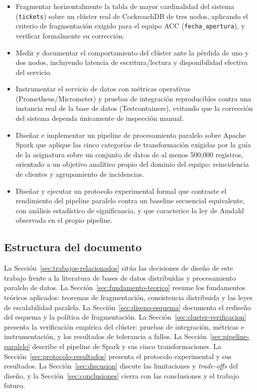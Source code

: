 \begin{itemize}[leftmargin=1.5em]
    \item Fragmentar horizontalmente la tabla de mayor cardinalidad del sistema
        (\texttt{tickets}) sobre un clúster real de CockroachDB de tres nodos, aplicando el
        criterio de fragmentación exigido para el equipo ACC (\texttt{fecha\_apertura}), y
        verificar formalmente su corrección.
    \item Medir y documentar el comportamiento del clúster ante la pérdida de uno y dos nodos,
        incluyendo latencia de escritura/lectura y disponibilidad efectiva del servicio.
    \item Instrumentar el servicio de datos con métricas operativas (Prometheus/Micrometer) y
        pruebas de integración reproducibles contra una instancia real de la base de datos
        (Testcontainers), evitando que la corrección del sistema dependa únicamente de
        inspección manual.
    \item Diseñar e implementar un pipeline de procesamiento paralelo sobre Apache Spark que
        aplique las cinco categorías de transformación exigidas por la guía de la asignatura
        sobre un conjunto de datos de al menos 500{,}000 registros, orientado a un objetivo
        analítico propio del dominio del equipo: reincidencia de clientes y agrupamiento de
        incidencias.
    \item Diseñar y ejecutar un protocolo experimental formal que contraste el rendimiento del
        pipeline paralelo contra un baseline secuencial equivalente, con análisis estadístico de
        significancia, y que caracterice la ley de Amdahl~\cite{amdahl1967validity} observada en
        el propio pipeline.
\end{itemize}

\subsection{Estructura del documento}

La Sección~\ref{sec:trabajos-relacionados} sitúa las decisiones de diseño de este trabajo frente a
la literatura de bases de datos distribuidas y procesamiento paralelo de datos. La
Sección~\ref{sec:fundamento-teorico} resume los fundamentos teóricos aplicados: teoremas de
fragmentación, consistencia distribuida y las leyes de escalabilidad paralela. La
Sección~\ref{sec:diseno-esquema} documenta el rediseño del esquema y la política de fragmentación.
La Sección~\ref{sec:cluster-verificacion} presenta la verificación empírica del clúster: pruebas
de integración, métricas e instrumentación, y los resultados de tolerancia a fallos. La
Sección~\ref{sec:pipeline-paralelo} describe el pipeline de Spark y sus cinco transformaciones. La
Sección~\ref{sec:protocolo-resultados} presenta el protocolo experimental y sus resultados. La
Sección~\ref{sec:discusion} discute las limitaciones y \emph{trade-offs} del diseño, y la
Sección~\ref{sec:conclusiones} cierra con las conclusiones y el trabajo futuro.
